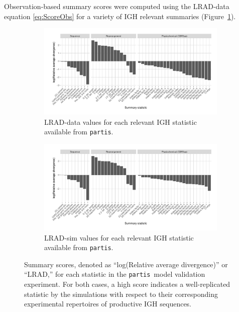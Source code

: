 \documentclass{article}
\newcommand{\partis}{\texttt{partis}}
\begin{document}
Observation-based summary scores were computed using the LRAD-data equation \eqref{eq:ScoreObs} for a variety of IGH relevant summaries (Figure~\ref{fig:ObsScoresBCR}).
\begin{figure}
	\begin{subfigure}{\textwidth}
    	\includegraphics[width=\linewidth]{Figures/PartisScores/obs_score_plot.pdf}
    	\caption{LRAD-data values for each relevant IGH statistic available from \partis.}
    	\label{fig:ObsScoresBCR}
	\end{subfigure}
	\begin{subfigure}{\textwidth}
    	\includegraphics[width=\linewidth]{Figures/PartisScores/sim_score_plot.pdf}
    	\caption{LRAD-sim values for each relevant IGH statistic available from \partis.}
    	\label{fig:SimScoresBCR}
	\end{subfigure}
	\caption{Summary scores, denoted as ``log(Relative average divergence)'' or ``LRAD,'' for each statistic in the \partis\ model validation experiment. For both cases, a high score indicates a well-replicated statistic by the simulations with respect to their corresponding experimental repertoires of productive IGH sequences.}
	\label{fig:BCRScores}
\end{figure}
\end{document}
